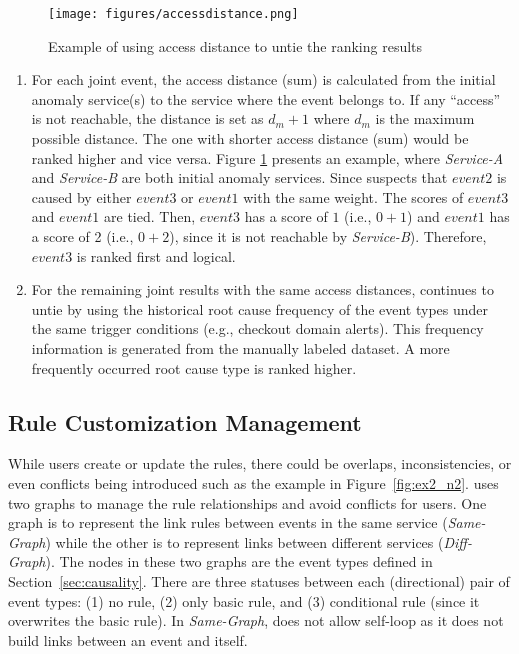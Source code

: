 \begin{figure}[t]
\centering
  \texttt{[image: figures/accessdistance.png]}
  \caption{Example of using access distance to untie the ranking results}
  \label{fig:untie}
\end{figure}
\begin{enumerate}
\item For each joint event, the access distance (sum) is calculated from the initial anomaly service(s) to the service where the event belongs to. If any ``access'' is not reachable, the distance is set as $d_m+1$ where $d_m$ is the maximum possible distance. The one with shorter access distance (sum) would be ranked higher and vice versa. Figure \ref{fig:untie} presents an example, where \emph{Service-A} and \emph{Service-B} are both initial anomaly services. Since \system suspects that $event 2$ is caused by either $event 3$ or $event 1$ with the same weight. The scores of $event 3$ and $event 1$ are tied. Then, $event 3$ has a score of $1$ (i.e., $0+1$) and $event 1$ has a score of 2 (i.e., $0+2$), since it is not reachable by \emph{Service-B}). Therefore, $event 3$ is ranked first and logical. 
\item For the remaining joint results with the same access distances, \system continues to untie by using the historical root cause frequency of the event types under the same trigger conditions (e.g., checkout domain alerts). This frequency information is generated from the manually labeled dataset. A more frequently occurred root cause type is ranked higher.%
\end{enumerate}


\subsection{Rule Customization Management}

While \system users create or update the rules,  there could be overlaps, inconsistencies, or even conflicts being introduced such as the example in Figure~\ref{fig:ex2_n2}. \system uses two graphs to manage the rule relationships and avoid conflicts for users. One graph is to represent the link rules between events in the same service (\emph{Same-Graph}) while the other is to represent links between different services (\emph{Diff-Graph}). The nodes in these two graphs are the event types defined in Section~\ref{sec:causality}. There are three statuses between each (directional) pair of event types: (1) no rule, (2) only basic rule, and (3) conditional rule (since it overwrites the basic rule). In \emph{Same-Graph}, \system does not allow self-loop as it does not build links between an event and itself.

